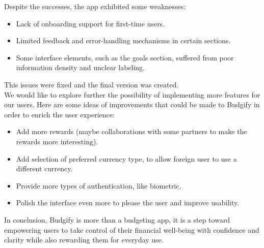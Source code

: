 \documentclass[a4paper,12pt]{article}
\begin{document}
Despite the successes, the app exhibited some weaknesses:
\begin{itemize}
    \item Lack of onboarding support for first-time users.
    \item Limited feedback and error-handling mechanisms in certain sections.
    \item Some interface elements, such as the goals section, suffered from poor information density and unclear labeling.
\end{itemize}
This issues were fixed and the final version was created.
\vspace{0.5cm}\\
We would like to explore further the possibility of implementing more features for our users. Here are some ideas of improvements that could be made to Budgify in order to enrich the user experience:
\begin{itemize}
    \item Add more rewards (maybe collaborations with some partners to make the rewards more interesting).
    \item Add selection of preferred currency type, to allow foreign user to use a different currency.
    \item Provide more types of authentication, like biometric.
    \item Polish the interface even more to please the user and improve usability.
\end{itemize}
In conclusion, Budgify is more than a budgeting app, it is a step toward empowering users to take control of their financial well-being with confidence and clarity while also rewarding them for everyday use.
\end{document}
